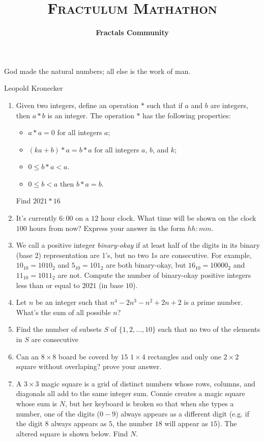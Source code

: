\documentclass[a4paper]{article}
\begin{document}
\author{\textbf{Fractals Community}}
\title{\textsc{Fractulum Mathathon}}
\maketitle

\epigraph{God made the natural numbers; all else is the work of man.}{Leopold Kronecker}

\begin{enumerate}
    \item
Given two integers, define an operation $*$ such that if $a$ and $b$ are integers, then $a*b$ is an integer.
The operation $*$ has the following properties:
\begin{itemize}
    \item $a*a = 0$ for all integers $a$;
    \item $(ka+b)*a = b* a$ for all integers $a$, $b$, and $k$;
    \item $0 \leq b*a < a$.
    \item $0 \leq b < a$ then $b*a = b$.
\end{itemize}
Find $2021 * 16$



\item It’s currently $6:00$ on a $12$ hour clock. What time will be shown on the clock $100$ hours from
now? Express your answer in the form $hh : mm$.


\item We call a positive integer \textit{binary-okay} if at least half of the digits in its binary (base 2) representation are 1’s, but no two 1s are consecutive. For example, $10_{10} = 1010_2$ and $5_{10} = 101_2$
are both binary-okay, but $16_{10} = {10000}_2$ and $11_{10} = {1011}_2$ are not. Compute the number of
binary-okay positive integers less than or equal to $2021$ (in base $10$).


\item Let $n$ be an integer such that $n^4 -2n^3 -n^2 +2n + 2$ is a prime number. What's the sum
of all possible $n$?


\item Find the number of subsets $S$ of $\{1,2,...,10\}$ such that no two of the elements in $S$ are consecutive

\item Can an $8\times8$ board be coverd by $15$ $1\times4$ rectangles and only one $2\times2$ square without overlaping? prove your answer.


\newpage
\item A $3  \times 3$ magic square is a grid of distinct numbers whose rows, columns, and diagonals
all add to the same integer sum. Connie creates a magic square whose sum is $N$, but her
keyboard is broken so that when she types a number, one of the digits ($0 - 9$) always appears
as a different digit (e.g. if the digit $8$ always appears as $5$, the number $18$ will appear as $15$).
The altered square is shown below. Find $N$.


\end{enumerate}
\end{document}
